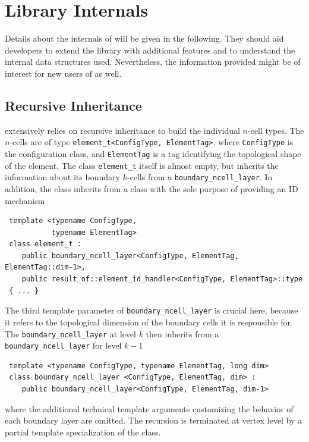 \chapter{Library Internals} \label{chap:internals}

 

Details about the internals of {\ViennaGrid} will be given in the following. 
They should aid developers to extend the library with additional features
and to understand the internal data structures used. 
Nevertheless, the information provided might be of interest for new users of {\ViennaGrid} as well.

\section{Recursive Inheritance}
{\ViennaGrid} extensively relies on recursive inheritance to build the individual $n$-cell types.
The $n$-cells are of type \lstinline|element_t<ConfigType, ElementTag>|, where \lstinline|ConfigType| is the configuration class,
and \lstinline|ElementTag| is a tag identifying the topological shape of the element. The class \lstinline|element_t| itself is almost empty, but
inherits the information about its boundary $k$-cells from a \lstinline|boundary_ncell_layer|. 
In addition, the class inherits from a class with the sole purpose of providing an ID mechanism
\begin{lstlisting}
 template <typename ConfigType,
           typename ElementTag>
 class element_t :
    public boundary_ncell_layer<ConfigType, ElementTag, ElementTag::dim-1>,
    public result_of::element_id_handler<ConfigType, ElementTag>::type
 { ... }
\end{lstlisting}
The third template parameter of \lstinline|boundary_ncell_layer| is crucial here,
because it refers to the topological dimension of the boundary cells it is responsible for.
The \lstinline|boundary_ncell_layer| at level $k$ then inherits from a \lstinline|boundary_ncell_layer| for level $k-1$
\begin{lstlisting}
 template <typename ConfigType, typename ElementTag, long dim>
 class boundary_ncell_layer <ConfigType, ElementTag, dim> :
    public boundary_ncell_layer<ConfigType, ElementTag, dim-1>
\end{lstlisting}
where the additional technical template arguments customizing the behavior of each boundary layer are omitted.
The recursion is terminated at vertex level by a partial template specialization of the class.

